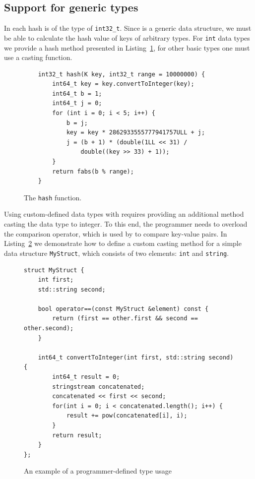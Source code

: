 \subsection{Support for generic types} 

    In \NvmHashMap each hash is of the type of \texttt{int32\_t}. 
    Since \NvmHashMap is a generic data structure, we must be able to calculate the hash value of keys of arbitrary types.
    For \texttt{int} data types we provide a hash method \cite{Hashing} presented in Listing~\ref{Hash}, for other basic types one must use a casting function. 
    
    \begin{figure}[ht]
\renewcommand{\figurename}{Listing}
\begin{lstlisting}
    int32_t hash(K key, int32_t range = 10000000) {
        int64_t key = key.convertToInteger(key);
        int64_t b = 1;
        int64_t j = 0;
        for (int i = 0; i < 5; i++) {
            b = j;
            key = key * 2862933555777941757ULL + j;
            j = (b + 1) * (double(1LL << 31) / 
                double((key >> 33) + 1));
        }
        return fabs(b % range);
    }
\end{lstlisting}
\caption{The \texttt{hash} function.}
\label{Hash}
\end{figure}

    Using custom-defined data types with \NvmHashMap requires providing an additional method casting the data type to integer.
    To this end, the programmer needs to overload the comparison operator, which is used by \NvmHashMap to compare key-value pairs. 
    In Listing~\ref{StdHashOverload} we demonstrate how to define a custom casting method for a simple data structure \texttt{MyStruct}, which consists of two elements: \texttt{int} and \texttt{string}. 
    
\begin{figure}[ht]
\renewcommand{\figurename}{Listing}
\begin{lstlisting}
struct MyStruct {
    int first;
    std::string second;
    
    bool operator==(const MyStruct &element) const {
        return (first == other.first && second == other.second);
    }
    
    int64_t convertToInteger(int first, std::string second) {
        int64_t result = 0;
        stringstream concatenated;
        concatenated << first << second;
        for(int i = 0; i < concatenated.length(); i++) {
            result += pow(concatenated[i], i);
        }
        return result;
    }
};
\end{lstlisting}
\caption{An example of a programmer-defined type usage}
\label{StdHashOverload}
\end{figure}

